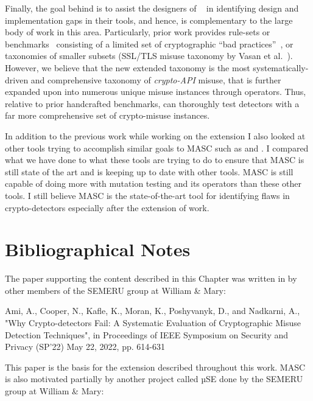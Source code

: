 Finally, the goal behind \tool is to assist the designers of \detectors~\cite{fhm+12,ebfk13,cognicrypteclipse,knr+17,KSA+18,deepsource,snyk,sonarqube,codeguru,codiga} in identifying design and implementation gaps in their tools, and hence, \tool is complementary to the large body of work in this area.
Particularly, prior work provides rule-sets or benchmarks~\cite{BDA+17,BDA+19} consisting of a limited set of cryptographic ``bad practices''~\cite{BD16}, or taxonomies of smaller subsets (\eg SSL/TLS misuse taxonomy by Vasan et al.~\cite{NVK16}).
However, we believe that the new extended taxonomy is the most systematically-driven and comprehensive taxonomy of {\em crypto-API} misuse, that is further expanded upon into numerous unique misuse instances through \tools operators.
Thus, relative to prior handcrafted benchmarks, \tool can thoroughly test detectors with a far more comprehensive set of crypto-misuse instances.

In addition to the previous work while working on the extension I also looked at other tools trying to accomplish similar goals to MASC such as \cite{Afrose_Xiao_Rahaman_Miller_Yao_2022} and \cite{Schlichtig_Wickert_Kruger_Bodden_Mezini_2022}. I compared what we have done to what these tools are trying to do to ensure that MASC is still state of the art and is keeping up to date with other tools. MASC is still capable of doing more with mutation testing and its operators than these other tools. I still believe MASC is the state-of-the-art tool for identifying flaws in crypto-detectors especially after the extension of work.






\section{Bibliographical Notes}
\label{ch1:sec:bibliographicalNotes}

The paper supporting the content described in this Chapter was written in by other members of the SEMERU group at William \& Mary:

Ami, A., Cooper, N., Kafle, K., Moran, K., Poshyvanyk, D., and Nadkarni, A., "Why Crypto-detectors Fail: A Systematic Evaluation of Cryptographic Misuse Detection Techniques", in Proceedings of IEEE Symposium on Security and Privacy (SP'22) May 22, 2022, pp. 614-631

This paper is the basis for the extension described throughout this work. MASC is also motivated partially by another project called µSE done by the SEMERU group at William \& Mary:

